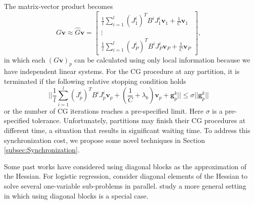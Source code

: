 \documentclass[12pt]{article}
\def\bv{{\boldsymbol v}}
\def\bg{{\boldsymbol g}}
\begin{document}
The matrix-vector product becomes
\begin{equation}
G\bv \approx \hat{G}\bv = 
\begin{bmatrix} \frac{1}{l}\sum_{i=1}^l (J^i_{1})^T B^i J^i_{1}\bv_1 + \frac{1}{C}\bv_1\\ \vdots \\ \frac{1}{l}\sum_{i=1}^l (J^i_{P})^T  B^{i} J^i_{P}\bv_P + \frac{1}{C}\bv_P 
\end{bmatrix}, 
\label{approx-jaco}
\end{equation}
in which each $(G\bv)_p$ can be calculated using only local information because we have independent linear systems. 
For the CG procedure at any partition, it is terminated if the following relative stopping condition holds
\begin{equation}
    \label{CG-stopping-cond}
    ||\frac{1}{l}\sum_{i=1}^l (J^i_p)^T B^i J^i_p \bv_p + (\frac{1}{C} + \lambda_k )\bv_p + \bg_p^k|| \leq \sigma ||\bg_p^k||
\end{equation}
or the number of CG iterations reaches a pre-specified limit. Here $\sigma$ is a pre-specified tolerance. Unfortunately, partitions may finish their CG procedures at different time,
a situation that results in significant waiting time. To address this synchronization cost, we propose some novel techniques in Section \ref{subsec:Synchronization}.
\par Some past works have considered using diagonal blocks as the approximation of the Hessian. For logistic regression, \cite{YB13a} consider diagonal elements of the Hessian
to solve several one-variable sub-problems in parallel. \cite{DM14a} study a more general setting in which using diagonal blocks is a special case.
\end{document}
